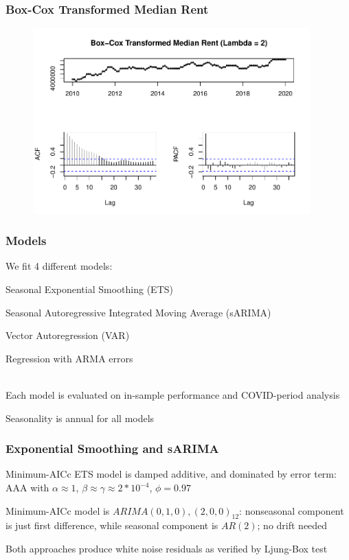 \documentclass[t]{beamer}
\let\tempone\itemize
\let\temptwo\enditemize
\renewenvironment{itemize}{\tempone\addtolength{\itemsep}{0.5\baselineskip}}{\temptwo}
\let\tempthree\enumerate
\let\tempfour\endenumerate
\renewenvironment{enumerate}{\tempthree\addtolength{\itemsep}{0.5\baselineskip}}{\tempfour}
\begin{document}
\begin{frame}
\frametitle{Box-Cox Transformed Median Rent}
\begin{figure}
\includegraphics[width=4.2in]{box_cox_rent.pdf}
\end{figure}
\end{frame}

\begin{frame}
\frametitle{Models}
We fit 4 different models:

\begin{enumerate}
\item Seasonal Exponential Smoothing (ETS)
\item Seasonal Autoregressive Integrated Moving Average (sARIMA)
\item Vector Autoregression (VAR)
\item Regression with ARMA errors
\end{enumerate}
\\~\\ %
\begin{itemize}
\item Each model is evaluated on in-sample performance and COVID-period analysis
\item Seasonality is annual for all models
\end{itemize}

\end{frame}

\begin{frame}
\frametitle{Exponential Smoothing and sARIMA}
\begin{itemize}
\item Minimum-AICc ETS model is damped additive, and dominated by error term: AAA with $\alpha\approx 1$, $\beta\approx\gamma\approx2*10^{-4}$, $\phi=0.97$
\item Minimum-AICc model is $ARIMA(0,1,0),(2,0,0)_{12}$: nonseasonal component is just first difference, while seasonal component is $AR(2)$; no drift needed
\item Both approaches produce white noise residuals as verified by Ljung-Box test
\end{itemize}
\end{frame}
\end{document}
